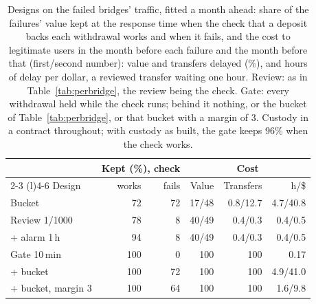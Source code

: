 \begin{table}[t]
\centering
\caption{Designs on the failed bridges' traffic, fitted a month ahead: share of the failures' value kept at the response time when the check that a deposit backs each withdrawal works and when it fails, and the cost to legitimate users in the month before each failure and the month before that (first/second number): value and transfers delayed (\%), and hours of delay per dollar, a reviewed transfer waiting one hour. Review: as in Table~\ref{tab:perbridge}, the review being the check. Gate: every withdrawal held while the check runs; behind it nothing, or the bucket of Table~\ref{tab:perbridge}, or that bucket with a margin of 3. Custody in a contract throughout; with custody as built, the gate keeps 96\% when the check works.}
\label{tab:pbcost}
\scriptsize
\setlength{\tabcolsep}{2.5pt}
\begin{tabular}{@{}l r r r r r@{}}
\toprule
 & \multicolumn{2}{c}{Kept (\%), check} & \multicolumn{3}{c}{Cost}  \\
\cmidrule(lr){2-3} \cmidrule(l){4-6}
Design & works & fails & Value & Transfers & h/\$ \\
\midrule
Bucket & 72 & 72 & 17/48 & 0.8/12.7 & 4.7/40.8 \\
Review 1/1000 & 78 & 8 & 40/49 & 0.4/0.3 & 0.4/0.5 \\
\quad + alarm 1\,h & 94 & 8 & 40/49 & 0.4/0.3 & 0.4/0.5 \\
Gate 10\,min & 100 & 0 & 100 & 100 & 0.17 \\
\quad + bucket & 100 & 72 & 100 & 100 & 4.9/41.0 \\
\quad + bucket, margin 3 & 100 & 64 & 100 & 100 & 1.6/9.8 \\
\bottomrule
\end{tabular}
\end{table}
